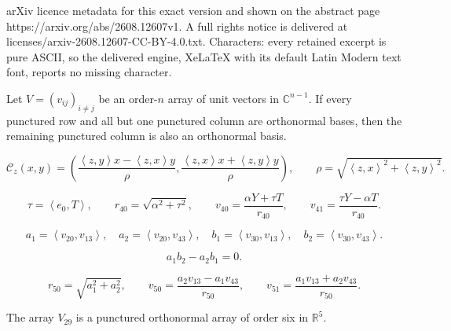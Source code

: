 \documentclass[10pt,a4paper]{amsart}
\newcommand{\C}{\mathbb C}
\newcommand{\R}{\mathbb R}
\newcommand{\ip}[2]{\left\langle #1,#2\right\rangle}
\begin{document}
arXiv licence metadata for this exact version and shown on the abstract page https://arxiv.org/abs/2608.12607v1. A full rights notice is delivered at licenses/arxiv-2608.12607-CC-BY-4.0.txt. Characters: every retained excerpt is pure ASCII, so the delivered engine, XeLaTeX with its default Latin Modern text font, reports no missing character.
\begin{lemma}\label{lem:missing-column}
Let $V=(v_{ij})_{i\ne j}$ be an order-$n$ array of unit vectors in
$\C^{n-1}$.  If every punctured row and all but one punctured column are
orthonormal bases, then the remaining punctured column is also an
orthonormal basis.
\end{lemma}

\begin{equation}\label{eq:completion}
\mathcal C_z(x,y)=
\left(
\frac{\ip{z}{y}x-\ip{z}{x}y}{\rho},
\frac{\ip{z}{x}x+\ip{z}{y}y}{\rho}
\right),
\qquad
\rho=\sqrt{\ip{z}{x}^2+\ip{z}{y}^2}.
\end{equation}

\begin{equation}\label{eq:v4041}
\tau=\ip{e_0}{T},\qquad
r_{40}=\sqrt{\alpha^2+\tau^2},\qquad
v_{40}=\frac{\alpha Y+\tau T}{r_{40}},\qquad
v_{41}=\frac{\tau Y-\alpha T}{r_{40}}.
\end{equation}

\begin{equation}\label{eq:aabb}
a_1=\ip{v_{20}}{v_{13}},\quad
a_2=\ip{v_{20}}{v_{43}},\quad
b_1=\ip{v_{30}}{v_{13}},\quad
b_2=\ip{v_{30}}{v_{43}}.
\end{equation}

\begin{equation}\label{eq:compatibility}
a_1b_2-a_2b_1=0.
\end{equation}

\begin{equation}\label{eq:v5051}
r_{50}=\sqrt{a_1^2+a_2^2},\qquad
v_{50}=\frac{a_2v_{13}-a_1v_{43}}{r_{50}},\qquad
v_{51}=\frac{a_1v_{13}+a_2v_{43}}{r_{50}}.
\end{equation}

\begin{proposition}\label{prop:V29}
The array $V_{29}$ is a punctured orthonormal array of order six in $\R^5$.
\end{proposition}
\end{document}
